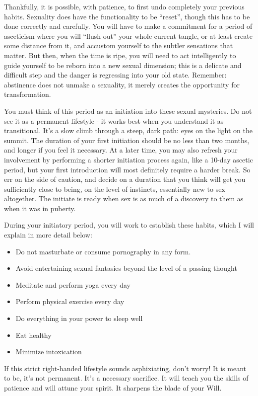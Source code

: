 \documentclass[a4paper,14pt]{memoir}
\begin{document}
Thankfully, it is possible, with patience, to first undo completely your previous habits. Sexuality does have the functionality to be ``reset'', though this has to be done correctly and carefully. You will have to make a commitment for a period of asceticism where you will ``flush out'' your whole current tangle, or at least create some distance from it, and accustom yourself to the subtler sensations that matter. But then, when the time is ripe, you will need to act intelligently to guide yourself to be reborn into a new sexual dimension; this is a delicate and difficult step and the danger is regressing into your old state. Remember: abstinence does not unmake a sexuality, it merely creates the opportunity for transformation.

You must think of this period as an initiation into these sexual mysteries. Do not see it as a permanent lifestyle - it works best when you understand it as transitional. It's a slow climb through a steep, dark path: eyes on the light on the summit. The duration of your first initiation should be no less than two months, and longer if you feel it necessary. At a later time, you may also refresh your involvement by performing a shorter initiation process again, like a 10-day ascetic period, but your first introduction will most definitely require a harder break. So err on the side of caution, and decide on a duration that you think will get you sufficiently close to being, on the level of instincts, essentially new to sex altogether. The initiate is ready when sex is as much of a discovery to them as when it was in puberty.

During your initiatory period, you will work to establish these habits, which I will explain in more detail below:

\begin{itemize}
	\item Do not masturbate or consume pornography in any form.
	\item Avoid entertaining sexual fantasies beyond the level of a passing thought
	\item Meditate and perform yoga every day
	\item Perform physical exercise every day
	\item Do everything in your power to sleep well
	\item Eat healthy
	\item Minimize intoxication
\end{itemize}

If this strict right-handed lifestyle sounds asphixiating, don't worry! It is meant to be, it's not permanent. It's a necessary sacrifice. It will teach you the skills of patience and will attune your spirit. It sharpens the blade of your Will.
\end{document}
